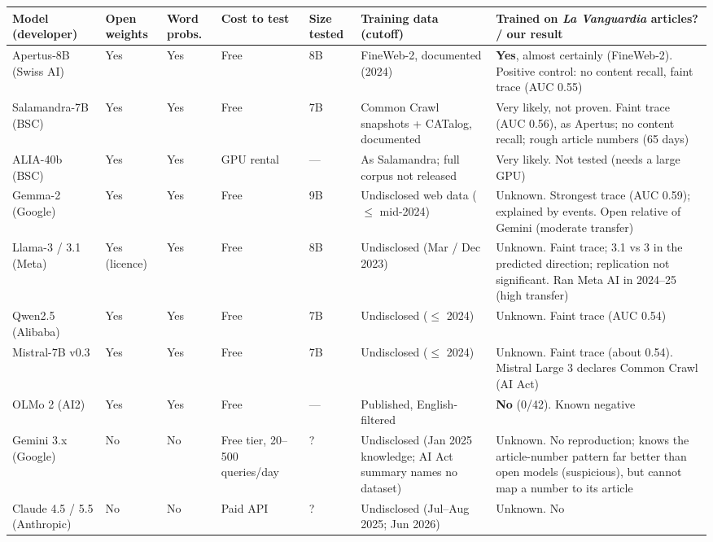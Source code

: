 \documentclass[10pt,a4paper]{article}
\begin{document}
\begin{table}[h]\centering\footnotesize
\begin{tabularx}{\linewidth}{>{\raggedright\arraybackslash}p{2.35cm}>{\raggedright\arraybackslash}p{1.05cm}>{\raggedright\arraybackslash}p{1.25cm}>{\raggedright\arraybackslash}p{1.25cm}>{\raggedright\arraybackslash}p{1.2cm}>{\raggedright\arraybackslash}X>{\raggedright\arraybackslash}X}
\toprule
Model (developer) & Open weights & Word probs. & Cost to test & Size tested & Training data (cutoff) & Trained on
\emph{La Vanguardia} articles? / our result\\
\midrule
Apertus-8B (Swiss AI) & Yes & Yes & Free & 8B & FineWeb-2, documented (2024) & \textbf{Yes}, almost certainly (FineWeb-2).
Positive control: no content recall, faint trace (AUC 0.55)\\
Salamandra-7B (BSC) & Yes & Yes & Free & 7B & 20 Common Crawl snapshots + CATalog, documented & Very likely, not proven.
Faint trace (AUC 0.56), as Apertus; no content recall; rough article numbers (65 days)\\
ALIA-40b (BSC) & Yes & Yes & GPU rental & --- & As Salamandra; full corpus not released & Very likely. Not tested
(needs a large GPU)\\
Gemma-2 (Google) & Yes & Yes & Free & 9B & Undisclosed web data ($\le$ mid-2024) & Unknown. Strongest trace (AUC 0.59);
explained by events. Open relative of Gemini (moderate transfer)\\
Llama-3 / 3.1 (Meta) & Yes (licence) & Yes & Free & 8B & Undisclosed (Mar / Dec 2023) & Unknown. Faint trace; 3.1 vs
3 in the predicted direction; replication not significant. Ran Meta AI in 2024--25 (high transfer)\\
Qwen2.5 (Alibaba) & Yes & Yes & Free & 7B & Undisclosed ($\le$ 2024) & Unknown. Faint trace (AUC 0.54)\\
Mistral-7B v0.3 & Yes & Yes & Free & 7B & Undisclosed ($\le$ 2024) & Unknown. Faint trace (about 0.54). Mistral Large 3
declares Common Crawl (AI Act)\\
OLMo 2 (AI2) & Yes & Yes & Free & --- & Published, English-filtered & \textbf{No} (0/42). Known negative\\
Gemini 3.x (Google) & No & No & Free tier, 20--500 queries/day & ? & Undisclosed (Jan 2025 knowledge; AI Act summary names no dataset) &
Unknown. No reproduction; knows the article-number pattern far better than open models (suspicious), but cannot
map a number to its article\\
Claude 4.5 / 5.5 (Anthropic) & No & No & Paid API & ? & Undisclosed (Jul--Aug 2025; Jun 2026) & Unknown. No

\end{tabularx}
\end{table}
\end{document}

